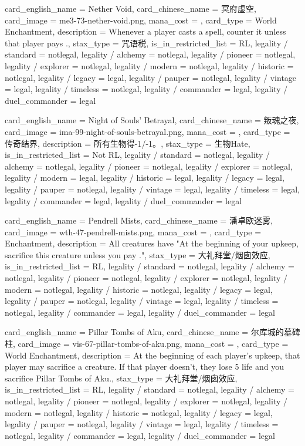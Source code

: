 \documentclass[lang = cn, color = black, 10pt]{AllThatStax}
\begin{document}
\card
{
	card_english_name = {Nether Void},
	card_chinese_name = {冥府虚空},
	card_image = me3-73-nether-void.png,
	mana_cost = ,
	card_type = World Enchantment,
	description = {Whenever a player casts a spell, counter it unless that player pays .},
	stax_type = 咒语税,
	is_in_restricted_list = RL,
	legality / standard = notlegal,
	legality / alchemy = notlegal,
	legality / pioneer = notlegal,
	legality / explorer = notlegal,
	legality / modern = notlegal,
	legality / historic = notlegal,
	legality / legacy = legal,
	legality / pauper = notlegal,
	legality / vintage = legal,
	legality / timeless = notlegal,
	legality / commander = legal,
	legality / duel_commander = legal
}

\card
{
	card_english_name = {Night of Souls' Betrayal},
	card_chinese_name = {叛魂之夜},
	card_image = ima-99-night-of-souls-betrayal.png,
	mana_cost = ,
	card_type = 传奇结界,
	description = {所有生物得-1/-1。},
	stax_type = 生物Hate,
	is_in_restricted_list = Not RL,
	legality / standard = notlegal,
	legality / alchemy = notlegal,
	legality / pioneer = notlegal,
	legality / explorer = notlegal,
	legality / modern = legal,
	legality / historic = legal,
	legality / legacy = legal,
	legality / pauper = notlegal,
	legality / vintage = legal,
	legality / timeless = legal,
	legality / commander = legal,
	legality / duel_commander = legal
}

\card
{
	card_english_name = {Pendrell Mists},
	card_chinese_name = {潘卓欧迷雾},
	card_image = wth-47-pendrell-mists.png,
	mana_cost = ,
	card_type = Enchantment,
	description = {All creatures have "At the beginning of your upkeep, sacrifice this creature unless you pay ."},
	stax_type = 大礼拜堂/烟囱效应,
	is_in_restricted_list = RL,
	legality / standard = notlegal,
	legality / alchemy = notlegal,
	legality / pioneer = notlegal,
	legality / explorer = notlegal,
	legality / modern = notlegal,
	legality / historic = notlegal,
	legality / legacy = legal,
	legality / pauper = notlegal,
	legality / vintage = legal,
	legality / timeless = notlegal,
	legality / commander = legal,
	legality / duel_commander = legal
}

\card
{
	card_english_name = {Pillar Tombs of Aku},
	card_chinese_name = {尔库城的墓碑柱},
	card_image = vis-67-pillar-tombs-of-aku.png,
	mana_cost = ,
	card_type = World Enchantment,
	description = {At the beginning of each player's upkeep, that player may sacrifice a creature. If that player doesn't, they lose 5 life and you sacrifice Pillar Tombs of Aku.},
	stax_type = 大礼拜堂/烟囱效应,
	is_in_restricted_list = RL,
	legality / standard = notlegal,
	legality / alchemy = notlegal,
	legality / pioneer = notlegal,
	legality / explorer = notlegal,
	legality / modern = notlegal,
	legality / historic = notlegal,
	legality / legacy = legal,
	legality / pauper = notlegal,
	legality / vintage = legal,
	legality / timeless = notlegal,
	legality / commander = legal,
	legality / duel_commander = legal
}
\end{document}
